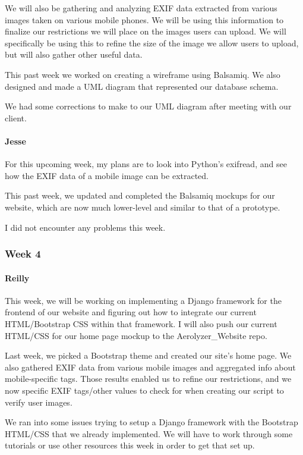 \documentclass[onecolumn, draftclsnofoot,10pt, compsoc]{IEEEtran}
\begin{document}
\begin{flushleft}
We will also be gathering and analyzing EXIF data extracted from various images taken on various mobile phones. We will be using this information to finalize our restrictions we will place on the images users can upload. We will specifically be using this to refine the size of the image we allow users to upload, but will also gather other useful data.
 
 
This past week we worked on creating a wireframe using Balsamiq. We also designed and made a UML diagram that represented our database schema.
 
 
We had some corrections to make to our UML diagram after meeting with our client.
 
\paragraph{Jesse}
 
For this upcoming week, my plans are to look into Python's exifread, and see how the EXIF data of a mobile image can be extracted.
 
 
This past week, we updated and completed the Balsamiq mockups for our website, which are now much lower-level and similar to that of a prototype.
 
 
I did not encounter any problems this week.
 
 
\subsubsection{Week 4}
\paragraph{Reilly}
 
This week, we will be working on implementing a Django framework for the frontend of our website and figuring out how to integrate our current HTML/Bootstrap CSS within that framework. I will also push our current HTML/CSS for our home page mockup to the Aerolyzer\_Website repo.
 
 
Last week, we picked a Bootstrap theme and created our site's home page. We also gathered EXIF data from various mobile images and aggregated info about mobile-specific tags. Those results enabled us to refine our restrictions, and we now specific EXIF tags/other values to check for when creating our script to verify user images.
 
 
We ran into some issues trying to setup a Django framework with the Bootstrap HTML/CSS that we already implemented. We will have to work through some tutorials or use other resources this week in order to get that set up.
 

\end{flushleft}
\end{document}
